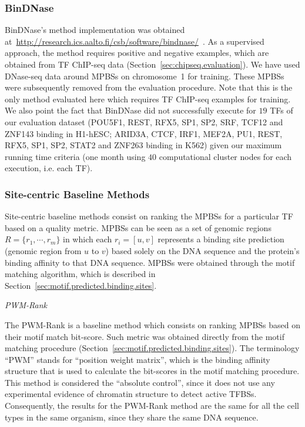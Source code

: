\subsubsection{BinDNase}

BinDNase's method implementation was obtained at~\url{http://research.ics.aalto.fi/csb/software/bindnase/}~\citep{kahara2015}. As a supervised approach, the method requires positive and negative examples, which are obtained from TF ChIP-seq data (Section~\ref{sec:chipseq.evaluation}). We have used DNase-seq data around MPBSs on chromosome~1 for training. These MPBSs were subsequently removed from the evaluation procedure. Note that this is the only method evaluated here which requires TF ChIP-seq examples for training. We also point the fact that BinDNase did not successfully execute for $19$ TFs of our evaluation dataset (POU5F1, REST, RFX5, SP1, SP2, SRF, TCF12 and ZNF143 binding in H1-hESC; ARID3A, CTCF, IRF1, MEF2A, PU1, REST, RFX5, SP1, SP2, STAT2 and ZNF263 binding in K562) given our maximum running time criteria (one month using $40$ computational cluster nodes for each execution, i.e. each TF).

\subsubsection{Site-centric Baseline Methods}

Site-centric baseline methods consist on ranking the MPBSs for a particular TF based on a quality metric. MPBSs can be seen as a set of genomic regions $R = \{ {r}_{1}, \cdots, {r}_{m} \}$ in which each ${r}_{i} = [u,v]$ represents a binding site prediction (genomic region from $u$ to $v$) based solely on the DNA sequence and the protein's binding affinity to that DNA sequence. MPBSs were obtained through the motif matching algorithm, which is described in Section~\ref{sec:motif.predicted.binding.sites}.

\vspace{0.5cm}
\noindent
\emph{PWM-Rank}
\vspace{0.3cm}

\noindent
The PWM-Rank is a baseline method which consists on ranking MPBSs based on their motif match bit-score. Such metric was obtained directly from the motif matching procedure (Section~\ref{sec:motif.predicted.binding.sites}). The terminology ``PWM'' stands for ``position weight matrix'', which is the binding affinity structure that is used to calculate the bit-scores in the motif matching procedure. This method is considered the ``absolute control'', since it does not use any experimental evidence of chromatin structure to detect active TFBSs. Consequently, the results for the PWM-Rank method are the same for all the cell types in the same organism, since they share the same DNA sequence.


